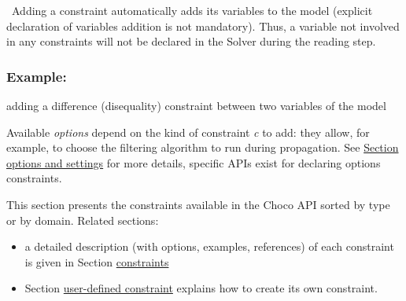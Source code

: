 

\begin{note}\
Adding a constraint automatically adds its variables to the model (explicit declaration of variables addition is not mandatory).
Thus, a variable not involved in any constraints will not be declared in the Solver during the reading step.
\end{note}


\subsubsection{Example:} adding a difference (disequality) constraint between two variables of the model



Available \emph{options} depend on the kind of constraint \emph{c} to add: they allow, for example, to choose the filtering algorithm to run during propagation. See \hyperlink{optionssettings}{Section options and settings} for more details, specific APIs exist for declaring options constraints.

This section presents the constraints available in the Choco API sorted by type or by domain. Related sections:
\begin{itemize}
\item a detailed description (with options, examples, references) of each constraint is given in Section \hyperlink{ch:constraints}{constraints}
\item Section \hyperlink{advanced:defineyourownconstraint}{user-defined constraint} explains how to create its own constraint.
\end{itemize}


